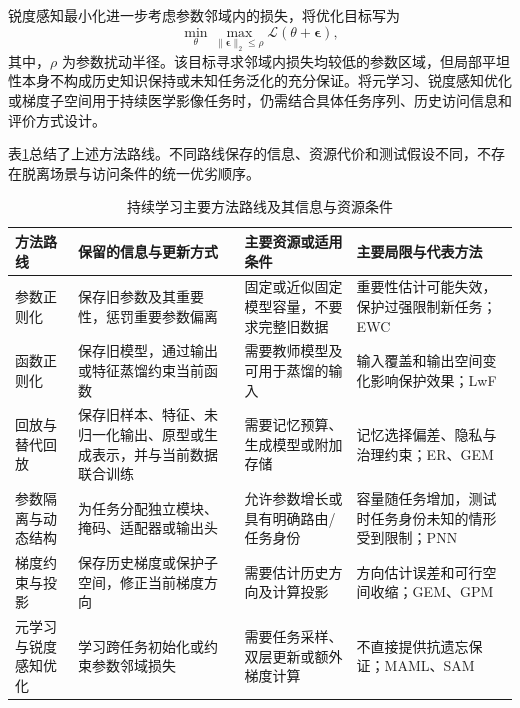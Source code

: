 锐度感知最小化进一步考虑参数邻域内的损失，将优化目标写为\cite{foret2021sam}
\begin{equation}
\min_{\theta}
\max_{\lVert\boldsymbol{\epsilon}\rVert_2\leq\rho}
\mathcal{L}
\!\left(
\theta+\boldsymbol{\epsilon}
\right),
\label{eq:foundations-sam}
\end{equation}
其中，$\rho$ 为参数扰动半径。该目标寻求邻域内损失均较低的参数区域，但局部平坦性本身不构成历史知识保持或未知任务泛化的充分保证。将元学习、锐度感知优化或梯度子空间用于持续医学影像任务时，仍需结合具体任务序列、历史访问信息和评价方式设计。

表\ref{tab:foundations-cl-method-families}总结了上述方法路线。不同路线保存的信息、资源代价和测试假设不同，不存在脱离场景与访问条件的统一优劣顺序。

\begin{table}[htbp]
\centering
\caption{持续学习主要方法路线及其信息与资源条件}
\label{tab:foundations-cl-method-families}
\thesistablefont
\setlength{\tabcolsep}{3pt}
\renewcommand{\arraystretch}{1.18}
\begin{tabular}{
>{\raggedright\arraybackslash}p{2.2cm}
>{\raggedright\arraybackslash}p{4.2cm}
>{\raggedright\arraybackslash}p{3.4cm}
>{\raggedright\arraybackslash}p{3.7cm}}
\toprule
方法路线 & 保留的信息与更新方式 & 主要资源或适用条件 & 主要局限与代表方法 \\
\midrule
参数正则化
& 保存旧参数及其重要性，惩罚重要参数偏离
& 固定或近似固定模型容量，不要求完整旧数据
& 重要性估计可能失效，保护过强限制新任务；EWC \\
函数正则化
& 保存旧模型，通过输出或特征蒸馏约束当前函数
& 需要教师模型及可用于蒸馏的输入
& 输入覆盖和输出空间变化影响保护效果；LwF \\
回放与替代回放
& 保存旧样本、特征、未归一化输出、原型或生成表示，并与当前数据联合训练
& 需要记忆预算、生成模型或附加存储
& 记忆选择偏差、隐私与治理约束；ER、GEM \\
参数隔离与动态结构
& 为任务分配独立模块、掩码、适配器或输出头
& 允许参数增长或具有明确路由/任务身份
& 容量随任务增加，测试时任务身份未知的情形受到限制；PNN \\
梯度约束与投影
& 保存历史梯度或保护子空间，修正当前梯度方向
& 需要估计历史方向及计算投影
& 方向估计误差和可行空间收缩；GEM、GPM \\
元学习与锐度感知优化
& 学习跨任务初始化或约束参数邻域损失
& 需要任务采样、双层更新或额外梯度计算
& 不直接提供抗遗忘保证；MAML、SAM \\
\bottomrule
\end{tabular}
\end{table}

